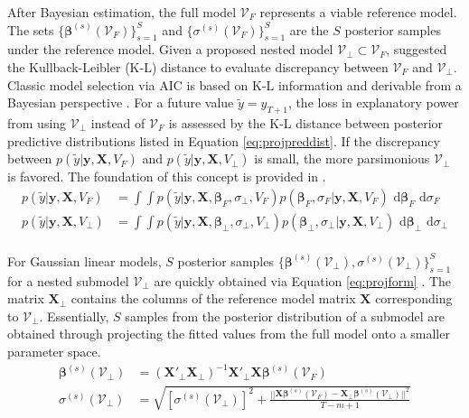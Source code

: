After Bayesian estimation, the full model $\mathcal{V}_F$ represents a viable reference model. The sets $\{\bm{\beta}^{(s)}(\mathcal{V}_F)\}_{s=1}^S$ and $\{\sigma^{(s)}(\mathcal{V}_F)\}_{s=1}^S$ are the $S$ posterior samples under the reference model. Given a proposed nested model $\mathcal{V}_\perp \subset \mathcal{V}_F$, \cite{Goutis1998} suggested the Kullback-Leibler (K-L) distance \citep{Kullback1951} to evaluate discrepancy between $\mathcal{V}_F$ and $\mathcal{V}_\perp$. Classic model selection via AIC is based on K-L information and derivable from a Bayesian perspective \citep{Akaike1974,Akaike1985,burnham2003,Burnham2004}. For a future value $\tilde{y}=y_{T+1}$, the loss in explanatory power from using $\mathcal{V}_\perp$ instead of $\mathcal{V}_F$  is assessed by the K-L distance between posterior predictive distributions listed in Equation \ref{eq:projpreddist}. If the discrepancy between $p(\tilde{y}|\bm{y},\bm{X},V_F)$ and $p(\tilde{y}|\bm{y},\bm{X},V_\perp)$ is small, the more parsimonious $\mathcal{V}_\perp$ is favored.  The foundation of this concept is provided in \cite{Dupuis2003,Nott2010,vehtari2012,Piironen2015b,Piironen2017}.
\begin{equation}
\label{eq:projpreddist}
\begin{split}
p(\tilde{y}|\bm{y},\bm{X},V_F)&=\int\int p(\tilde{y}|\bm{y},\bm{X},\bm{\beta}_F,\sigma_\perp,V_F)p(\bm{\beta}_F,\sigma_F|\bm{y},\bm{X},V_F) \textrm{ d}\bm{\beta}_F \textrm{ d}\sigma_F\\
p(\tilde{y}|\bm{y},\bm{X},V_\perp)&=\int\int p(\tilde{y}|\bm{y},\bm{X},\bm{\beta}_\perp,\sigma_\perp,V_\perp)p(\bm{\beta}_\perp,\sigma_\perp|\bm{y},\bm{X},V_\perp) \textrm{ d}\bm{\beta}_\perp \textrm{ d}\sigma_\perp\\
\end{split}
\end{equation}


For Gaussian linear models, $S$ posterior samples $\{\bm{\beta}^{(s)}(\mathcal{V}_\perp),\sigma^{(s)}(\mathcal{V}_\perp)\}_{s=1}^S$ for a nested submodel $\mathcal{V}_\perp$ are quickly obtained via Equation \ref{eq:projform}  \citep{Piironen2015b}. The matrix $\bm{X}_\perp$ contains the columns of the reference model matrix $\bm{X}$ corresponding to $\mathcal{V}_\perp$. Essentially, $S$ samples from the posterior distribution of a submodel are obtained through projecting the fitted values from the full model onto a smaller parameter space.
\begin{equation}
\label{eq:projform}
\begin{split}
	\bm{\beta}^{(s)}(\mathcal{V}_\perp) &= (\bm{X}'_\perp\bm{X}_\perp)^{-1}\bm{X}'_\perp\bm{X}\bm{\beta}^{(s)}(\mathcal{V}_F) \\
	\sigma^{(s)}(\mathcal{V}_\perp) &=\sqrt{[\sigma^{(s)}(\mathcal{V}_\perp)]^2+\frac{||\bm{X}\bm{\beta}^{(s)}(\mathcal{V}_F)-\bm{X}_\perp \bm{\beta}^{(s)}(\mathcal{V}_\perp)||^2}{T-m+1}}
\end{split}
\end{equation}

